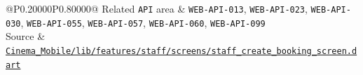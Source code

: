 \begin{longtable}{@{}P{0.20000\SRSWidth}P{0.80000\SRSWidth}@{}}
Related \texttt{API} area & \texttt{WEB-\allowbreak{}API-\allowbreak{}013}, \texttt{WEB-\allowbreak{}API-\allowbreak{}023}, \texttt{WEB-\allowbreak{}API-\allowbreak{}030}, \texttt{WEB-\allowbreak{}API-\allowbreak{}055}, \texttt{WEB-\allowbreak{}API-\allowbreak{}057}, \texttt{WEB-\allowbreak{}API-\allowbreak{}060}, \texttt{WEB-\allowbreak{}API-\allowbreak{}099} \\[3pt]
Source & \href{../../../Cinema\_Mobile/lib/features/staff/screens/staff\_create\_booking\_screen.dart}{\texttt{Cinema\_\allowbreak{}Mobile/\allowbreak{}lib/\allowbreak{}features\allowbreak{}/\allowbreak{}staff/\allowbreak{}screens/\allowbreak{}staff\_\allowbreak{}create\_\allowbreak{}booking\_\allowbreak{}screen.\allowbreak{}dart}} \\[3pt]
\end{longtable}
\endgroup

